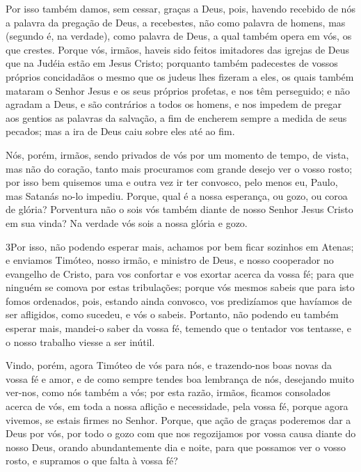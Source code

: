 Por isso também damos, sem cessar, graças a Deus, pois, havendo
recebido de nós a palavra da pregação de Deus, a recebestes, não
como palavra de homens, mas (segundo é, na verdade), como palavra de
Deus, a qual também opera em vós, os que crestes. Porque vós,
irmãos, haveis sido feitos imitadores das igrejas de Deus que na
Judéia estão em Jesus Cristo; porquanto também padecestes de vossos
próprios concidadãos o mesmo que os judeus lhes fizeram a eles,
os quais também mataram o Senhor Jesus e os seus próprios
profetas, e nos têm perseguido; e não agradam a Deus, e são
contrários a todos os homens, e nos impedem de pregar aos
gentios as palavras da salvação, a fim de encherem sempre a medida
de seus pecados; mas a ira de Deus caiu sobre eles até ao fim.

Nós, porém, irmãos, sendo privados de vós por um momento de
tempo, de vista, mas não do coração, tanto mais procuramos com
grande desejo ver o vosso rosto; por isso bem quisemos uma e
outra vez ir ter convosco, pelo menos eu, Paulo, mas Satanás no-lo
impediu. Porque, qual é a nossa esperança, ou gozo, ou coroa
de glória? Porventura não o sois vós também diante de nosso Senhor
Jesus Cristo em sua vinda? Na verdade vós sois a nossa glória
e gozo.

\medskip

\lettrine{3} Por isso, não podendo esperar mais, achamos por
bem ficar sozinhos em Atenas; e enviamos Timóteo, nosso irmão, e
ministro de Deus, e nosso cooperador no evangelho de Cristo, para
vos confortar e vos exortar acerca da vossa fé; para que ninguém
se comova por estas tribulações; porque vós mesmos sabeis que para
isto fomos ordenados, pois, estando ainda convosco, vos
predizíamos que havíamos de ser afligidos, como sucedeu, e vós o
sabeis. Portanto, não podendo eu também esperar mais, mandei-o
saber da vossa fé, temendo que o tentador vos tentasse, e o nosso
trabalho viesse a ser inútil.

Vindo, porém, agora Timóteo de vós para nós, e trazendo-nos boas
novas da vossa fé e amor, e de como sempre tendes boa lembrança de
nós, desejando muito ver-nos, como nós também a vós; por esta
razão, irmãos, ficamos consolados acerca de vós, em toda a nossa
aflição e necessidade, pela vossa fé, porque agora vivemos, se
estais firmes no Senhor. Porque, que ação de graças poderemos
dar a Deus por vós, por todo o gozo com que nos regozijamos por
vossa causa diante do nosso Deus, orando abundantemente dia e
noite, para que possamos ver o vosso rosto, e supramos o que falta à
vossa fé?


